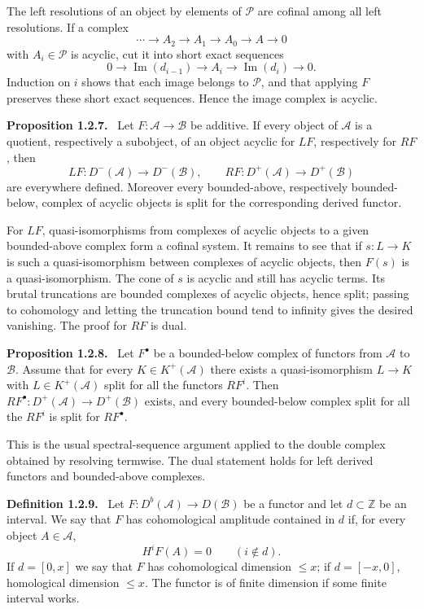 \documentclass[12pt]{article}
\newcommand{\A}{\mathcal{A}}
\newcommand{\B}{\mathcal{B}}
\newcommand{\Zz}{\mathbb{Z}}
\newenvironment{statement}[1]{\par\medskip\noindent\textbf{#1.}\ }{\par\medskip}
\begin{document}
The left resolutions of an object by elements of \(\mathcal P\) are cofinal among all left resolutions. If a complex
\[
\cdots\to A_2\to A_1\to A_0\to A\to0
\]
with \(A_i\in\mathcal P\) is acyclic, cut it into short exact sequences
\[
0\to\operatorname{Im}(d_{i-1})\to A_i\to\operatorname{Im}(d_i)\to0.
\]
Induction on \(i\) shows that each image belongs to \(\mathcal P\), and that applying \(F\) preserves these short exact sequences. Hence the image complex is acyclic.

\begin{statement}{Proposition 1.2.7}
Let \(F:\A\to\B\) be additive. If every object of \(\A\) is a quotient, respectively a subobject, of an object acyclic for \(LF\), respectively for \(RF\), then
\[
LF:D^-(\A)\to D^-(\B),
\qquad
RF:D^+(\A)\to D^+(\B)
\]
are everywhere defined. Moreover every bounded-above, respectively bounded-below, complex of acyclic objects is split for the corresponding derived functor.
\end{statement}

For \(LF\), quasi-isomorphisms from complexes of acyclic objects to a given bounded-above complex form a cofinal system. It remains to see that if \(s:L\to K\) is such a quasi-isomorphism between complexes of acyclic objects, then \(F(s)\) is a quasi-isomorphism. The cone of \(s\) is acyclic and still has acyclic terms. Its brutal truncations are bounded complexes of acyclic objects, hence split; passing to cohomology and letting the truncation bound tend to infinity gives the desired vanishing. The proof for \(RF\) is dual.

\begin{statement}{Proposition 1.2.8}
Let \(F^\bullet\) be a bounded-below complex of functors from \(\A\) to \(\B\). Assume that for every \(K\in K^+(\A)\) there exists a quasi-isomorphism \(L\to K\) with \(L\in K^+(\A)\) split for all the functors \(RF^i\). Then \(RF^\bullet:D^+(\A)\to D^+(\B)\) exists, and every bounded-below complex split for all the \(RF^i\) is split for \(RF^\bullet\).
\end{statement}

This is the usual spectral-sequence argument applied to the double complex obtained by resolving termwise. The dual statement holds for left derived functors and bounded-above complexes.

\begin{statement}{Definition 1.2.9}
Let \(F:D^b(\A)\to D(\B)\) be a functor and let \(d\subset\Zz\) be an interval. We say that \(F\) has cohomological amplitude contained in \(d\) if, for every object \(A\in\A\),
\[
H^iF(A)=0\qquad (i\notin d).
\]
If \(d=[0,x]\) we say that \(F\) has cohomological dimension \(\le x\); if \(d=[-x,0]\), homological dimension \(\le x\). The functor is of finite dimension if some finite interval works.
\end{statement}
\end{document}
